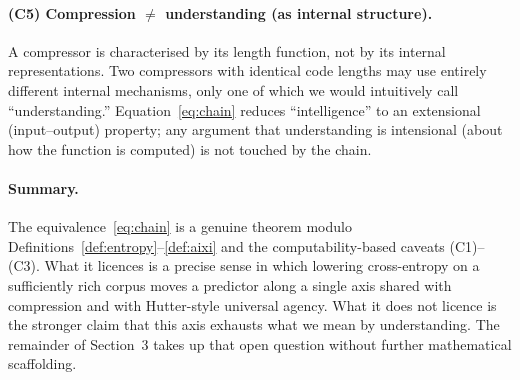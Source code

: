 \paragraph{(C5) Compression $\ne$ understanding (as internal structure).}
A compressor is characterised by its length function, not by its
internal representations. Two compressors with identical code lengths
may use entirely different internal mechanisms, only one of which we
would intuitively call ``understanding.'' Equation~\eqref{eq:chain}
reduces ``intelligence'' to an extensional (input--output) property;
any argument that understanding is intensional (about how the function
is computed) is not touched by the chain.

\paragraph{Summary.}
The equivalence~\eqref{eq:chain} is a genuine theorem modulo
Definitions~\ref{def:entropy}--\ref{def:aixi} and the
computability-based caveats (C1)--(C3). What it licences is a precise
sense in which lowering cross-entropy on a sufficiently rich corpus
moves a predictor along a single axis shared with compression and
with Hutter-style universal agency. What it does not licence is the
stronger claim that this axis exhausts what we mean by understanding.
The remainder of Section~3 takes up that open question without
further mathematical scaffolding.

